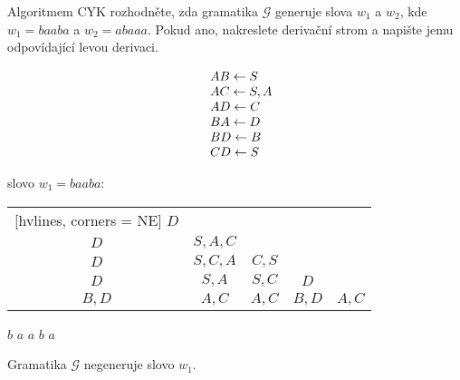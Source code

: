 Algoritmem CYK rozhodněte, zda gramatika $\mathcal{G}$ generuje slova $w_1$ a $w_2$, kde $w_1 = baaba$ a $w_2 = abaaa$.
 Pokud ano, nakreslete derivační strom a napište jemu odpovídající levou derivaci.


\begin{minipage}{0.5\textwidth}
    

\[
    \begin{array}{l l}
    & AB \leftarrow S \\
    & AC \leftarrow S, A \\
    & AD \leftarrow C \\
    & BA \leftarrow D \\
    & BD \leftarrow B \\ 
    & CD \leftarrow S \\ 
    \end{array}
\]
\end{minipage}\begin{minipage}{0.5\textwidth}
    
slovo $w_1 = baaba$: 

\vspace*{2mm}

\begin{NiceTabular}{ccccc}[hvlines, corners = NE] %
    $D$ &  &   &   &   \\ 
    $D$ & $S, A, C$ &  &   &   \\ 
    $D$ & $S, C, A$ & $C, S$ &  &  \\ 
    $D$ & $S, A$ & $S, C$ & $D$ &  \\ 
    $B, D$ & $A,C$ & $A,C$ & $B, D$ & $A, C$ \\ 
\end{NiceTabular}

\hspace*{5mm}$b$ \hspace*{10mm} $a$ \hspace*{10mm} $a$ \hspace*{9mm} $b$ \hspace*{8mm} $a$
    
\vspace*{2mm}
    Gramatika $\mathcal{G}$ negeneruje slovo $w_1$. 

\end{minipage}


